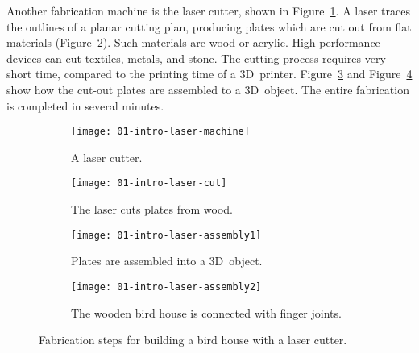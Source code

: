 \documentclass[../ClassicThesis.tex]{subfiles}
\begin{document}


Another fabrication machine is the laser cutter, shown in
Figure~\ref{fig:intro-laser:machine}. A laser traces the
outlines of a planar cutting plan, producing plates which
are cut out from flat materials
(Figure~\ref{fig:intro-laser:cut}). Such materials are wood
or acrylic. High-performance devices can cut textiles,
metals, and stone. The cutting process requires very short
time, compared to the printing time of a 3D~printer.
Figure~\ref{fig:intro-laser:assembly1} and
Figure~\ref{fig:intro-laser:assembly2} show how the cut-out
plates are assembled to a 3D~object. The entire fabrication
is completed in several minutes.


\begin{figure}[!ht]
  \centering
  \begin{subfigure}[a]{0.49\textwidth}
    \texttt{[image: 01-intro-laser-machine]}
    \caption{A laser cutter.}
    \label{fig:intro-laser:machine}
  \end{subfigure}
  \begin{subfigure}[b]{0.49\textwidth}
    \texttt{[image: 01-intro-laser-cut]}
    \caption{The laser cuts plates from wood.}
    \label{fig:intro-laser:cut}
  \end{subfigure}
  \begin{subfigure}[c]{0.49\textwidth}
    \texttt{[image: 01-intro-laser-assembly1]}
    \caption{Plates are assembled into a 3D~object. }
    \label{fig:intro-laser:assembly1}
  \end{subfigure}
  \begin{subfigure}[d]{0.49\textwidth}
    \texttt{[image: 01-intro-laser-assembly2]}
    \caption{The wooden bird house is connected with finger
      joints.}
    \label{fig:intro-laser:assembly2}
  \end{subfigure}
  \caption{Fabrication steps for building a bird house with
    a laser cutter.}
  \label{fig:intro-laser}
\end{figure}
\end{document}

